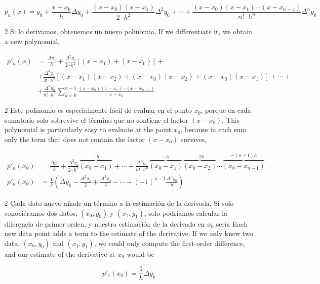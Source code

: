 \begin{equation*}
p_n(x)=y_0+\frac{x-x_0}{h}\Delta y_0+\frac{(x-x_0)(x-x_1)}{2\cdot h^2}\Delta^2 y_0+\cdots +\frac{(x-x_0)(x-x_1)\cdots (x-x_{n-1})}{n! \cdot h^n}\Delta^n y_0
\end{equation*}
\begin{paracol}{2}
Si lo derivamos, obtenemos un nuevo polinomio,
\switchcolumn
If we differentiate it, we obtain a new polynomial,
\end{paracol}
\begin{align*}
p'_n(x)&=\frac{\Delta y_0}{h}+\frac{\Delta^2 y_0}{2\cdot h^2}\left[(x-x_1)+(x-x_0) \right] +\\
&+\frac{\Delta^3 y_0}{3! \cdot h^3}\left[(x-x_1)(x-x_2)+(x-x_0)(x-x_2)+(x-x_0)(x-x_1)\right]+\cdots +\\
&+\frac{\Delta^n y_0}{n! \cdot h^n}\sum_{k=0}^{n-1}\frac{(x-x_0)(x-x_1)\cdots (x-x_{n-1})}{x-x_k}
\end{align*}
\begin{paracol}{2}
Este polinomio es especialmente fácil de evaluar en el punto $x_0$, porque en cada sumatorio solo sobrevive el término que no contiene el factor $(x-x_0)$,
\switchcolumn
This polynomial is particularly easy to evaluate at the point $x_0$, because in each sum only the term that does not contain the factor $(x-x_0)$ survives,
\end{paracol}
\begin{align*}
p'_n(x_0)&=\frac{\Delta y_0}{h}+\frac{\Delta^2 y_0}{2\cdot h^2}\overbrace{(x_0-x_1)}^{-h}+\cdots +
\frac{\Delta^n y_0}{n! \cdot h^n}\overbrace{(x_0-x_1)}^{-h}\overbrace{(x_0-x_2)}^{-2h}\cdots \overbrace{(x_0-x_{n-1})}^{-(n-1)h}\\
p'_n(x_0)&=\frac{1}{h}\left(\Delta y_0-\frac{\Delta^2 y_0}{2}+\frac{\Delta^3 y_0}{3}-\cdots +
(-1)^{n-1}\frac{\Delta^n y_0}{n}\right)
\end{align*}
\begin{paracol}{2}
Cada dato nuevo añade un término a la estimación de la derivada. Si solo conociéramos dos datos, $(x_0, y_0)$ y $(x_1, y_1)$, solo podríamos calcular la diferencia de primer orden, y nuestra estimación de la derivada en $x_0$ sería
\switchcolumn
Each new data point adds a term to the estimate of the derivative. If we only knew two data, $(x_0,y_0)$ and $(x_1,y_1)$, we could only compute the first-order difference, and our estimate of the derivative at $x_0$ would be
\end{paracol}
\begin{equation*}
p'_1(x_0)=\frac{1}{h}\Delta y_0
\end{equation*}
